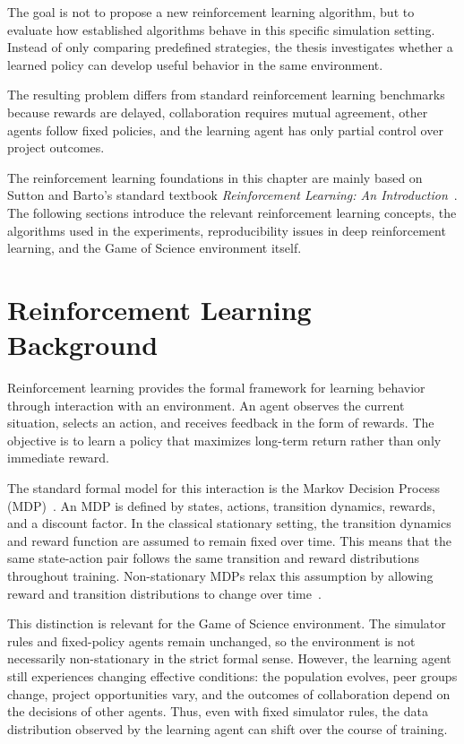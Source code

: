 \documentclass[english,bachelor]{hsluthesis}
\begin{document}
The goal is not to propose a new reinforcement learning algorithm, but to evaluate how established algorithms behave in this specific simulation setting. Instead of only comparing predefined strategies, the thesis investigates whether a learned policy can develop useful behavior in the same environment.

The resulting problem differs from standard reinforcement learning benchmarks because rewards are delayed, collaboration requires mutual agreement, other agents follow fixed policies, and the learning agent has only partial control over project outcomes.

The reinforcement learning foundations in this chapter are mainly based on Sutton and Barto's standard textbook \textit{Reinforcement Learning: An Introduction}~\cite{sutton2018reinforcement}. The following sections introduce the relevant reinforcement learning concepts, the algorithms used in the experiments, reproducibility issues in deep reinforcement learning, and the Game of Science environment itself.

\section{Reinforcement Learning Background}

Reinforcement learning provides the formal framework for learning behavior through interaction with an environment. An agent observes the current situation, selects an action, and receives feedback in the form of rewards. The objective is to learn a policy that maximizes long-term return rather than only immediate reward.

The standard formal model for this interaction is the Markov Decision Process (MDP)~\cite{sutton2018reinforcement}. An MDP is defined by states, actions, transition dynamics, rewards, and a discount factor. In the classical stationary setting, the transition dynamics and reward function are assumed to remain fixed over time. This means that the same state-action pair follows the same transition and reward distributions throughout training. Non-stationary MDPs relax this assumption by allowing reward and transition distributions to change over time~\cite{pmlr-v119-cheung20a}.

This distinction is relevant for the Game of Science environment. The simulator rules and fixed-policy agents remain unchanged, so the environment is not necessarily non-stationary in the strict formal sense. However, the learning agent still experiences changing effective conditions: the population evolves, peer groups change, project opportunities vary, and the outcomes of collaboration depend on the decisions of other agents. Thus, even with fixed simulator rules, the data distribution observed by the learning agent can shift over the course of training.
\end{document}
